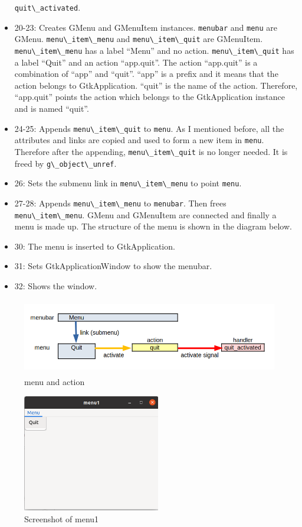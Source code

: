\begin{itemize}
  \passthrough{\lstinline!quit\_activated!}.
\item
  20-23: Creates GMenu and GMenuItem instances.
  \passthrough{\lstinline!menubar!} and \passthrough{\lstinline!menu!}
  are GMenu. \passthrough{\lstinline!menu\_item\_menu!} and
  \passthrough{\lstinline!menu\_item\_quit!} are GMenuItem.
  \passthrough{\lstinline!menu\_item\_menu!} has a label ``Menu'' and no
  action. \passthrough{\lstinline!menu\_item\_quit!} has a label
  ``Quit'' and an action ``app.quit''. The action ``app.quit'' is a
  combination of ``app'' and ``quit''. ``app'' is a prefix and it means
  that the action belongs to GtkApplication. ``quit'' is the name of the
  action. Therefore, ``app.quit'' points the action which belongs to the
  GtkApplication instance and is named ``quit''.
\item
  24-25: Appends \passthrough{\lstinline!menu\_item\_quit!} to
  \passthrough{\lstinline!menu!}. As I mentioned before, all the
  attributes and links are copied and used to form a new item in
  \passthrough{\lstinline!menu!}. Therefore after the appending,
  \passthrough{\lstinline!menu\_item\_quit!} is no longer needed. It is
  freed by \passthrough{\lstinline!g\_object\_unref!}.
\item
  26: Sets the submenu link in
  \passthrough{\lstinline!menu\_item\_menu!} to point
  \passthrough{\lstinline!menu!}.
\item
  27-28: Appends \passthrough{\lstinline!menu\_item\_menu!} to
  \passthrough{\lstinline!menubar!}. Then frees
  \passthrough{\lstinline!menu\_item\_menu!}. GMenu and GMenuItem are
  connected and finally a menu is made up. The structure of the menu is
  shown in the diagram below.
\item
  30: The menu is inserted to GtkApplication.
\item
  31: Sets GtkApplicationWindow to show the menubar.
\item
  32: Shows the window.
\end{itemize}

\begin{figure}
\centering
\includegraphics[width=12.555cm,height=3.285cm]{../image/menu1.png}
\caption{menu and action}
\end{figure}

\begin{figure}
\centering
\includegraphics[width=6cm,height=5.115cm]{../image/menu1_screenshot.png}
\caption{Screenshot of menu1}
\end{figure}

